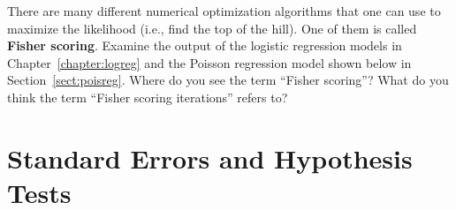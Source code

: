 \begin{question}{}
There are many different numerical optimization algorithms that one can use to maximize the likelihood (i.e., find the top of the hill). One of them is called \textbf{Fisher scoring}. Examine the output of the logistic regression models in Chapter~\ref{chapter:logreg} and the Poisson regression model shown below in Section~\ref{sect:poisreg}. Where do you see the term ``Fisher scoring''? What do you think the term ``Fisher scoring iterations'' refers to?
\end{question}


\section{Standard Errors and Hypothesis Tests \label{section:sehyp}}

